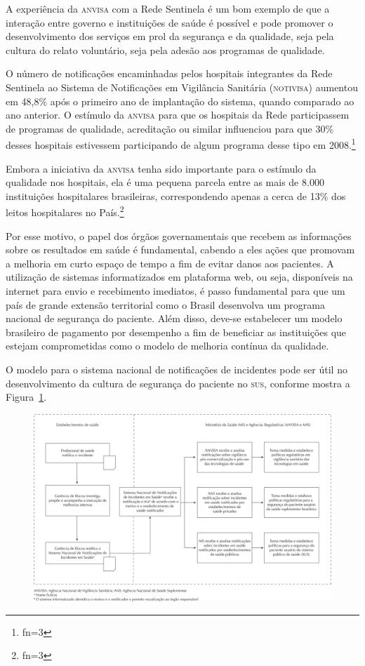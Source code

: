 \documentclass{article}
\makeatletter
\newcommand{\fn}{\afterassignment\fn@aux\count0=}
\newcommand{\fn@aux}{\csname fn\the\count0\endcsname}
\makeatother
\begin{document}
A experiência da \textsc{anvisa} com a Rede Sentinela é um bom exemplo de que a interação
entre
governo e instituições de saúde é possível e pode promover o desenvolvimento dos
serviços em
prol da segurança e da qualidade, seja pela cultura do relato voluntário, seja
pela adesão
aos programas de qualidade.

O número de notificações encaminhadas pelos hospitais integrantes da Rede
Sentinela ao
Sistema de Notificações em Vigilância Sanitária (\textsc{notivisa}) aumentou em 48,8\%
após o primeiro
ano de implantação do sistema, quando comparado ao ano anterior. O estímulo da
\textsc{anvisa} para
que os hospitais da Rede participassem de programas de qualidade, acreditação ou
similar
influenciou para que 30\% desses hospitais estivessem participando de algum
programa desse
tipo em 2008.\footnote{\fn3}

Embora a iniciativa da \textsc{anvisa} tenha sido importante para o estímulo da qualidade
nos
hospitais, ela é uma pequena parcela entre as mais de 8.000 instituições
hospitalares
brasileiras, correspondendo apenas a cerca de 13\% dos leitos hospitalares no
País.\footnote{\fn3}

Por esse motivo, o papel dos órgãos governamentais que recebem as informações
sobre os
resultados em saúde é fundamental, cabendo a eles ações que promovam a melhoria
em curto
espaço de tempo a fim de evitar danos aos pacientes. A utilização de sistemas
informatizados
em plataforma web, ou seja, disponíveis na internet para envio e recebimento
imediatos, é
passo fundamental para que um país de grande extensão territorial como o Brasil
desenvolva
um programa nacional de segurança do paciente. Além disso, deve-se estabelecer
um modelo
brasileiro de pagamento por desempenho a fim de beneficiar as instituições que
estejam
comprometidas como o modelo de melhoria contínua da qualidade.

O modelo para o sistema nacional de notificações de incidentes pode ser útil no
desenvolvimento da cultura de segurança do paciente no \textsc{sus}, conforme mostra a
Figura~\ref{fig:f01}.

\begin{figure}
\includegraphics[width=\textwidth]{0034-8910-rsp-47-04-0791-gf01}
\caption{}\label{fig:f01}
\end{figure}
\end{document}
